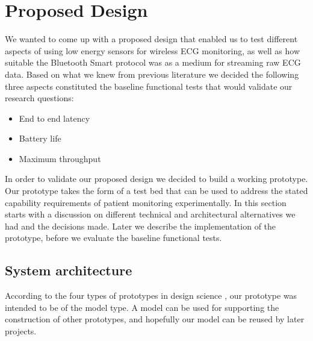 \section{Proposed Design} %
\label{sec:proposed_design}

We wanted to come up with a proposed design that enabled us to test different aspects of using low energy sensors for wireless ECG monitoring, as well as how suitable the Bluetooth Smart protocol was as a medium for streaming raw ECG data. Based on what we knew from previous literature we decided the following three aspects constituted the baseline functional tests that would validate our research questions:
\begin{itemize}
	
	\item End to end latency
	\item Battery life
	\item Maximum throughput
  
\end{itemize}

In order to validate our proposed design we decided to build a working prototype. Our prototype takes the form of a test bed that can be used to address the stated capability requirements of patient monitoring experimentally. In this section starts with a discussion on different technical and architectural alternatives we had and the decisions made. Later we describe the implementation of the prototype, before we evaluate the baseline functional tests.

\subsection{System architecture} %
\label{sub:system_architecture}

According to the four types of prototypes in design science \cite{ds_bok1_25}, our prototype was intended to be of the model type. A model can be used for supporting the construction of other prototypes, and hopefully our model can be reused by later projects.

